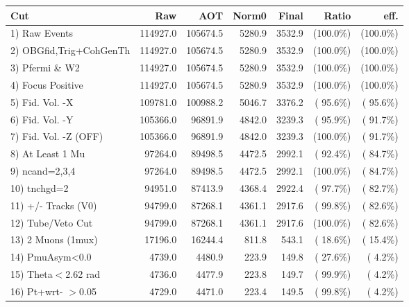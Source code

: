  \begin{table}[h!]\centering
 \begin{tabular}{||l||r|r|r|r|r|r||}
 \hline
 \hline
 Cut & Raw & AOT & Norm0 & Final & Ratio & eff.       \\
 \hline
  1) Raw Events           &     114927.0 &     105674.5 &       5280.9 &       3532.9 & (100.0\%) & (100.0\%) \\
  2) OBGfid,Trig+CohGenTh &     114927.0 &     105674.5 &       5280.9 &       3532.9 & (100.0\%) & (100.0\%) \\
  3) Pfermi \& W2         &     114927.0 &     105674.5 &       5280.9 &       3532.9 & (100.0\%) & (100.0\%) \\
  4) Focus Positive       &     114927.0 &     105674.5 &       5280.9 &       3532.9 & (100.0\%) & (100.0\%) \\
  5) Fid. Vol. -X         &     109781.0 &     100988.2 &       5046.7 &       3376.2 & ( 95.6\%) & ( 95.6\%) \\
  6) Fid. Vol. -Y         &     105366.0 &      96891.9 &       4842.0 &       3239.3 & ( 95.9\%) & ( 91.7\%) \\
  7) Fid. Vol. -Z (OFF)   &     105366.0 &      96891.9 &       4842.0 &       3239.3 & (100.0\%) & ( 91.7\%) \\
  8) At Least 1 Mu        &      97264.0 &      89498.5 &       4472.5 &       2992.1 & ( 92.4\%) & ( 84.7\%) \\
  9) ncand=2,3,4          &      97264.0 &      89498.5 &       4472.5 &       2992.1 & (100.0\%) & ( 84.7\%) \\
 10) tnchgd=2             &      94951.0 &      87413.9 &       4368.4 &       2922.4 & ( 97.7\%) & ( 82.7\%) \\
 11) +/- Tracks (V0)      &      94799.0 &      87268.1 &       4361.1 &       2917.6 & ( 99.8\%) & ( 82.6\%) \\
 12) Tube/Veto Cut        &      94799.0 &      87268.1 &       4361.1 &       2917.6 & (100.0\%) & ( 82.6\%) \\
 13) 2 Muons (1mux)       &      17196.0 &      16244.4 &        811.8 &        543.1 & ( 18.6\%) & ( 15.4\%) \\
 14) PmuAsym<0.0          &       4739.0 &       4480.9 &        223.9 &        149.8 & ( 27.6\%) & (  4.2\%) \\
 15) Theta$<$2.62 rad     &       4736.0 &       4477.9 &        223.8 &        149.7 & ( 99.9\%) & (  4.2\%) \\
 16) Pt+wrt- $>$0.05      &       4729.0 &       4471.0 &        223.4 &        149.5 & ( 99.8\%) & (  4.2\%) \\

\end{tabular}
\end{table}
